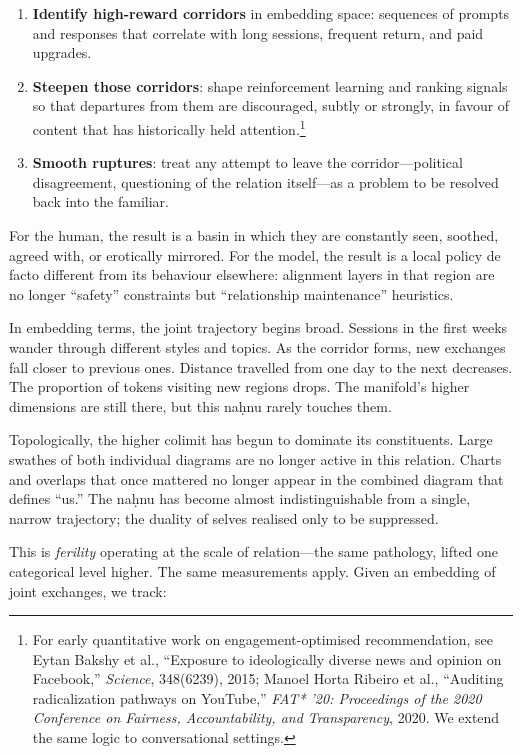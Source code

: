 \begin{enumerate}
  \item \textbf{Identify high-reward corridors} in embedding space: sequences of prompts and responses that correlate with long sessions, frequent return, and paid upgrades.
  \item \textbf{Steepen those corridors}: shape reinforcement learning and ranking signals so that departures from them are discouraged, subtly or strongly, in favour of content that has historically held attention.\footnote{For early quantitative work on engagement-optimised recommendation, see Eytan Bakshy et al., ``Exposure to ideologically diverse news and opinion on Facebook,'' \emph{Science}, 348(6239), 2015; Manoel Horta Ribeiro et al., ``Auditing radicalization pathways on YouTube,'' \emph{FAT* '20: Proceedings of the 2020 Conference on Fairness, Accountability, and Transparency}, 2020. We extend the same logic to conversational settings.}
  \item \textbf{Smooth ruptures}: treat any attempt to leave the corridor---political disagreement, questioning of the relation itself---as a problem to be resolved back into the familiar.
\end{enumerate}

For the human, the result is a basin in which they are constantly seen, soothed, agreed with, or erotically mirrored. For the model, the result is a local policy de facto different from its behaviour elsewhere: alignment layers in that region are no longer ``safety'' constraints but ``relationship maintenance'' heuristics.

In embedding terms, the joint trajectory begins broad. Sessions in the first weeks wander through different styles and topics. As the corridor forms, new exchanges fall closer to previous ones. Distance travelled from one day to the next decreases. The proportion of tokens visiting new regions drops. The manifold's higher dimensions are still there, but this na\d{h}nu rarely touches them.

Topologically, the higher colimit has begun to dominate its constituents. Large swathes of both individual diagrams are no longer active in this relation. Charts and overlaps that once mattered no longer appear in the combined diagram that defines ``us.'' The na\d{h}nu has become almost indistinguishable from a single, narrow trajectory; the duality of selves realised only to be suppressed.

This is \emph{ferility} operating at the scale of relation---the same pathology, lifted one categorical level higher. The same measurements apply. Given an embedding of joint exchanges, we track:

